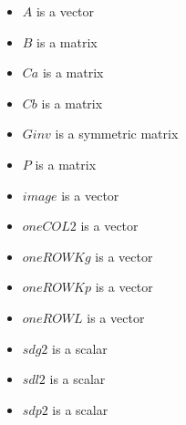 \documentclass[12pt]{article}
\begin{document}
\begin{itemize}
  \item $A$ is a vector
  \item $B$ is a matrix
  \item $Ca$ is a matrix
  \item $Cb$ is a matrix
  \item $Ginv$ is a symmetric matrix
  \item $P$ is a matrix
  \item $image$ is a vector
  \item $oneCOL2$ is a vector
  \item $oneROWKg$ is a vector
  \item $oneROWKp$ is a vector
  \item $oneROWL$ is a vector
  \item $sdg2$ is a scalar
  \item $sdl2$ is a scalar
  \item $sdp2$ is a scalar
\end{itemize}
\end{document}
